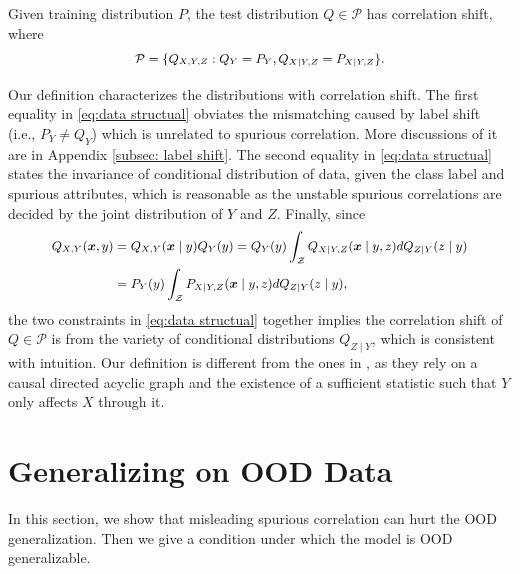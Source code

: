 \documentclass{article} %
\newcommand{\bx}{\boldsymbol{x}}
\newcommand{\cZ}{\mathcal{Z}}
\newcommand{\cP}{\mathcal{P}}
\begin{document}
	\par
	\begin{definition}\label{def:correlation shift}
		Given training distribution $P$, the test distribution $Q\in \cP$ has correlation shift, where 
		\begin{equation}\label{eq:data structual}
			\small
			\begin{aligned}
				\cP = \{Q_{X, Y, Z}: Q_{Y} = P_{Y}, Q_{X\mid Y, Z} = P_{X\mid Y, Z}\}.
			\end{aligned}
		\end{equation}
	\end{definition}
	Our definition characterizes the distributions with correlation shift. The first equality in \eqref{eq:data structual} obviates the mismatching caused by label shift (i.e., $P_{Y}\neq Q_{Y}$) which is unrelated to spurious correlation. More discussions of it are in Appendix \ref{subsec: label shift}. The second equality in \eqref{eq:data structual} states the invariance of conditional distribution of data, given the class label and spurious attributes, which is reasonable as the unstable spurious correlations are decided by the joint distribution of $Y$ and $Z$. Finally, since 
	\begin{equation}
		\small
		\begin{aligned}
			Q_{X, Y}(\bx, y) & = Q_{X, Y}(\bx\mid y)Q_{Y}(y) = Q_{Y}(y)\int_{\cZ} Q_{X\mid Y, Z}(\bx\mid y,  z)dQ_{Z\mid Y}(z\mid y) \\
			& = P_{Y}(y)\int_{\cZ} P_{X\mid Y, Z}(\bx\mid y,  z)dQ_{Z\mid Y}(z\mid y),
		\end{aligned}
	\end{equation}
	the two constraints in \eqref{eq:data structual} together implies the correlation shift of $Q\in\cP$ is from the variety of conditional distributions $Q_{Z \mid Y}$, which is consistent with intuition. Our definition is different from the ones in \citep{mahajan2021domain,makar2022fairness}, as they rely on a causal directed acyclic graph and the existence of a sufficient statistic such that $Y$ only affects $X$ through it. 
	
	\section{Generalizing on OOD Data}\label{sec:Generalizing on OOD Data Under Spurious Correlation}
	In this section, we show that misleading spurious correlation can hurt the OOD generalization. Then we give a condition under which the model is OOD generalizable. 
\end{document}
